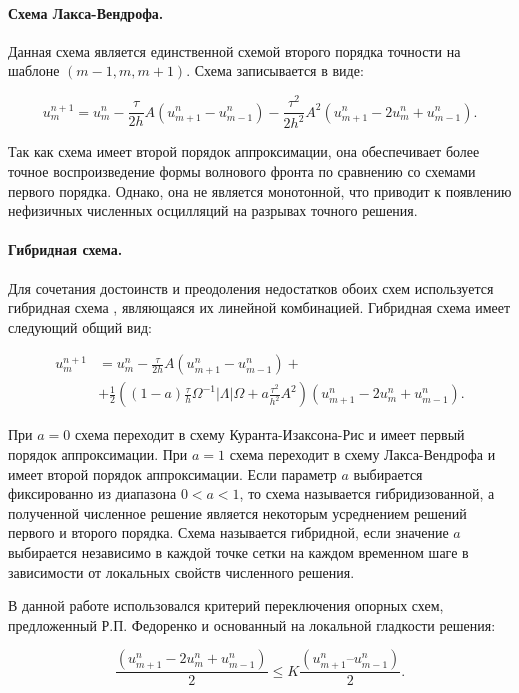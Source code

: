 \paragraph{Схема Лакса-Вендрофа.} Данная схема является единственной схемой второго порядка точности на шаблоне $(m-1, m, m+1)$. Схема записывается в виде:

\begin{equation}
	\label{LW scheme}
	u^{n+1}_m = u^n_m - \frac{\tau}{2h} A (u^n_{m+1} - u^n_{m-1})
	 - \frac{\tau^2}{2h^2} A^2 (u^n_{m+1} - 2u^n_m + u^n_{m-1}) .
\end{equation}

Так как схема имеет второй порядок аппроксимации, она обеспечивает более точное воспроизведение формы волнового фронта по сравнению со схемами первого порядка. Однако, она не является монотонной, что приводит к появлению нефизичных численных осцилляций на разрывах точного решения.


\paragraph{Гибридная схема.} Для сочетания достоинств и преодоления недостатков обоих схем используется гибридная схема \cite{fedorenko}, являющаяся их линейной комбинацией. Гибридная схема имеет следующий общий вид:

\begin{align}
\label{hybrid scheme}
u^{n+1}_m &= u^n_m - \frac{\tau}{2h} A (u^n_{m+1} - u^n_{m-1}) + \nonumber\\
	 &+ \frac{1}{2} ((1-a) \frac{\tau}{h} \Omega^{-1} |\Lambda| \Omega + a \frac{\tau^2}{h^2} A^2 ) (u^n_{m+1} - 2u^n_m + u^n_{m-1}).
\end{align}

При $a = 0$ схема переходит в схему Куранта-Изаксона-Рис и имеет первый порядок аппроксимации. При $a = 1$ схема переходит в схему Лакса-Вендрофа и имеет второй порядок аппроксимации. Если параметр $a$ выбирается фиксированно из диапазона $0 < a < 1$, то схема называется гибридизованной, а полученной численное решение является некоторым усреднением решений первого и второго порядка. Схема называется гибридной, если значение $a$ выбирается независимо в каждой точке сетки на каждом временном шаге в зависимости от локальных свойств численного решения.

В данной работе использовался критерий переключения опорных схем, предложенный Р.П. Федоренко и основанный на локальной гладкости решения:

\begin{equation}
	\label{Fedorenko criterium}
	\frac{(u^n_{m+1} - 2u^n_m + u^n_{m-1})}{2} \le K \frac{(u^n_{m+1} – u^n_{m-1})}{2} .
\end{equation}

